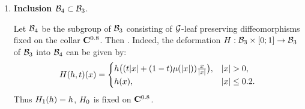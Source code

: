 \begin{enumerate}[wide, label={\rm\arabic*)}, topsep=1ex, itemsep=1ex]
Let $\fGFixSandw := \ker(\liftFunc{})$ be the kernel of $\liftFunc{}$, so it consists of elements $\dif\in\fGLin$ for which $\liftFunc{\dif}\equiv 0$, i.e.\ $\ttdif$ is fixed on $\bR^2\times(0;\aConst]$.
One easily checks that the following two statements hold.
\begin{enumerate}[label={\rm\alph*)}, leftmargin=*]
\item {\em $\CRRaa$ is convex and therefore contractible.}
\item {\em The homomorphism $\liftFunc{}:\fGLin\to\CRRaa$ admits a continuous section $s:\CRRaa \to \fGLin$.}
Actually, for each $\delta\in\CRRaa$ we have the following diffeomorphism
\[
    \tdif_{\delta}:\DxR\to\DxR,
    \qquad
    \tdif_{\delta}(\as,\aw) = \bigl(\as, \aw e^{2\pi i (1-\mu(\arad)) \delta(\as)} \bigr).
\]
Evidently, it is fixed near $\SxR$, fixed on $\ZxR$, commutes with the covering translation $\xi:\DxR\to\DxR$ and preserves the function $\tgfunc$.
Hence $\tdif_{\delta}$ yields a unique diffeomorphism $\dif_{\delta}:\SKlein\to\SKlein$, which is fixed near $\partial\SKlein$ and preserves $\gfunc$.
In turn, $\tdif_{\delta}$ is lifting of $\dif_{\delta}$ and is of the form~\ref{enum:cond_B3:th} of Lemma~\ref{lm:cond_B3}.
Hence $\dif_{\delta}\in\fGLin$.
\end{enumerate}
Now, similarly to the proof for the inclusion $\fGFixZR\subset\fGTotal$, these conditions imply that $\fGFixSandw$ is a strong deformation retract of $\fGLin$.


\item\label{enum:incl_FixCollar__FixSandw}
{\bf Inclusion $\mathcal{B}_{ 4 }\subset\mathcal{B}_{ 3 }$}.

Let $\mathcal{B}_{ 4 }$ be the subgroup of $\fGFixSandw$ consisting of $\mathcal{G}$-leaf preserving diffeomorphisms fixed on the collar $\mathbf{C}^{0.8}$.
Then .
Indeed, the deformation $H:\mathcal{B}_{ 3 }\times[0;1]\to\mathcal{B}_{ 3 }$ of $\fGFixSandw$ into $\mathcal{B}_{ 4 }$ can be given by:
\begin{equation}\label{equ:homotopy:incl_FixCollar__FixSandw}
H(h,t)(x) =
\begin{cases}
h\bigl((t\vert x\vert + (1-t)\mu(\vert x\vert)) \frac{x}{\vert x\vert} \bigr), & \vert x\vert>0, \\
h(x), & \vert x\vert\leq 0.2.
\end{cases}
\end{equation}
Thus $H_{1}(h)=h$, $H_{0}$ is fixed on $\mathbf{C}^{0.8}$.



\end{enumerate}
